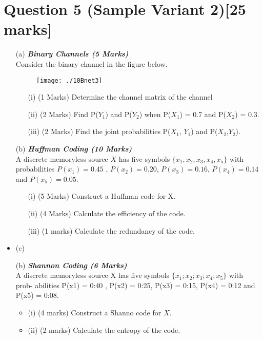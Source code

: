 \documentclass[]{article}
\begin{document}
\section{Question 5 (Sample Variant 2)[25 marks]}

\begin{itemize}
\item[(a)] \textbf{\textit{Binary Channels (5 Marks)}}\\

Consider the binary channel in the figure below.
\begin{figure}[h!]
\centering
\texttt{[image: ./10Bnet3]}
\caption{}
\label{fig:10Bnet3}
\end{figure}

\begin{itemize}
\item[(i)] (1 Marks) Determine the channel matrix of the channel
\item[(ii)] (2 Marks)  Find P($Y_1$) and P($Y_2$) when P($X_1$) = 0.7 and P($X_2$) = 0.3.
\item[(iii)] (2 Marks)  Find the joint probabilities P($X_1$, $Y_1$) and P($X_2$,$Y_2$).
\end{itemize}

\item[(b)] \textbf{\textit{Huffman Coding (10 Marks)}}\\
A discrete memoryless source $X$ has five symbols $\{x_1,x_2,x_3,x_4,x_5\}$ with probabilities $P(x_1) = 0.45$ , $P(x_2) = 0.20$, $P(x_3) = 0.16$, $P(x_4) = 0.14$ and $P(x_5) = 0.05$.

\begin{itemize}
\item[(i)] (5 Marks) Construct a Huffman code for X.
\item[(ii)] (4 Marks) Calculate the efficiency of the code.
\item[(iii)] (1 marks) Calculate the redundancy of the code.
\end{itemize}

\item(c) \item[(b)] \textbf{\textit{Shannon Coding (6 Marks)}}\\
A discrete memoryless source X has five symbols $\{x_1; x_2; x_3; x_4; x_5\}$ with prob-
abilities P(x1) = 0:40 , P(x2) = 0:25, P(x3) = 0:15, P(x4) = 0:12 and
P(x5) = 0:08.
\begin{itemize}
\item(i) (4 marks) Construct a Shanno code for $X$.
\item(ii) (2 marks) Calculate the entropy of the code.
\end{itemize}



\end{itemize}
\end{document}
